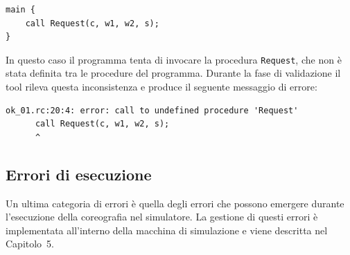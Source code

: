 \begin{tcolorbox}[colback=white,colframe=black!35,boxrule=0.4pt]
\begin{lstlisting}
main {
    call Request(c, w1, w2, s);
}
\end{lstlisting}
\end{tcolorbox}
In questo caso il programma tenta di invocare la procedura \texttt{Request}, che non è stata definita tra le procedure del programma. Durante la fase di validazione il tool rileva questa inconsistenza e produce il seguente messaggio di errore:

\begin{tcolorbox}[colback=black!2,colframe=black!35,boxrule=0.4pt]
\begin{verbatim}
ok_01.rc:20:4: error: call to undefined procedure 'Request'
      call Request(c, w1, w2, s);
      ^
\end{verbatim}
\end{tcolorbox}

\subsection*{Errori di esecuzione}

Un ultima categoria di errori è quella degli errori che possono emergere durante l’esecuzione della coreografia nel simulatore.
La gestione di questi errori è implementata all’interno della macchina di simulazione e viene descritta nel Capitolo~5.